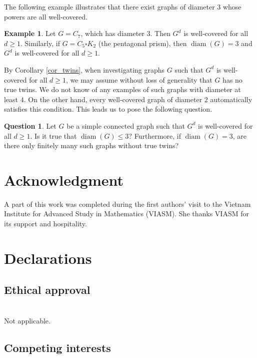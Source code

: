\documentclass[12pt]{amsart}
\numberwithin{equation}{section}
\theoremstyle{definition}
\newtheorem{exam}[thm]{Example}
\newtheorem{quest}[thm]{Question}
\begin{document}
The following example illustrates that there exist graphs of diameter $3$ whose powers are all well-covered.

\begin{exam}
Let $G = C_7$, which has diameter $3$. Then $G^d$ is well-covered for all $d \ge 1$. Similarly, if $G = C_5 \square K_2$ (the pentagonal prism), then $\operatorname{diam}(G) = 3$ and $G^d$ is well-covered for all $d \ge 1$.
\end{exam}

By Corollary \ref{cor_twins}, when investigating graphs $G$ such that $G^d$ is well-covered for all $d \ge 1$, we may assume without loss of generality that $G$ has no true twins. We do not know of any examples of such graphs with diameter at least $4$. On the other hand, every well-covered graph of diameter $2$ automatically satisfies this condition. This leads us to pose the following question.

\begin{quest}
Let $G$ be a simple connected graph such that $G^d$ is well-covered for all $d \ge 1$. Is it true that $\operatorname{diam}(G) \le 3$? Furthermore, if $\operatorname{diam}(G) = 3$, are there only finitely many such graphs without true twins?
\end{quest}

\section{Acknowledgment} 
A part of this work was completed during the first authors' visit to the Vietnam Institute for Advanced Study in Mathematics (VIASM). She thanks VIASM for its support and hospitality. 
   
  
  \section*{Declarations}
  
  
  \subsection*{\bf Ethical approval}\ \\[-0.3cm]
  
  \noindent Not applicable.
  
  
  \subsection*{\bf Competing interests}\ \\[-0.3cm]
  
\end{document}
